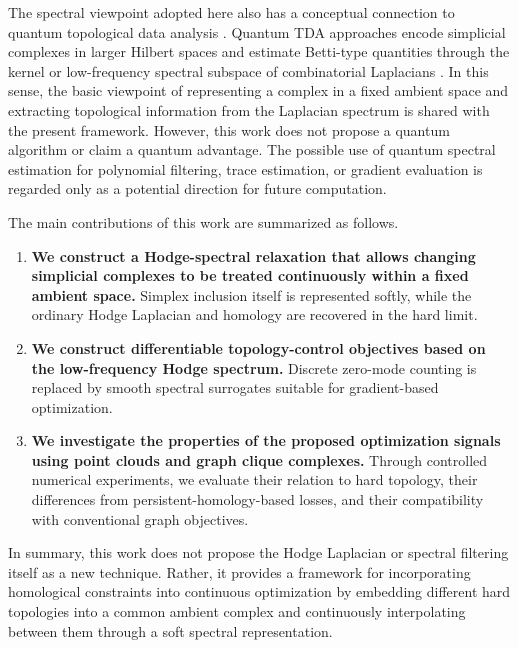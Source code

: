 \documentclass[pdflatex,sn-mathphys-num]{sn-jnl}%
\theoremstyle{thmstyleone}%
\theoremstyle{thmstyletwo}%
\theoremstyle{thmstylethree}%
\begin{document}
The spectral viewpoint adopted here also has a conceptual connection to quantum topological data analysis \cite{lloyd2016quantum,gyurik2022towards,ameneyro2024quantum,hayakawa2022quantum,yamauchi2025quantum}. Quantum TDA approaches encode simplicial complexes in larger Hilbert spaces and estimate Betti-type quantities through the kernel or low-frequency spectral subspace of combinatorial Laplacians \cite{ubaru2021quantumtopologicaldataanalysis,akhalwaya2024comparing}. In this sense, the basic viewpoint of representing a complex in a fixed ambient space and extracting topological information from the Laplacian spectrum is shared with the present framework. However, this work does not propose a quantum algorithm or claim a quantum advantage. The possible use of quantum spectral estimation for polynomial filtering, trace estimation, or gradient evaluation is regarded only as a potential direction for future computation.

The main contributions of this work are summarized as follows.

\begin{enumerate}
    \item \textbf{We construct a Hodge-spectral relaxation that allows changing simplicial complexes to be treated continuously within a fixed ambient space.}
    Simplex inclusion itself is represented softly, while the ordinary Hodge Laplacian and homology are recovered in the hard limit.

    \item \textbf{We construct differentiable topology-control objectives based on the low-frequency Hodge spectrum.}
    Discrete zero-mode counting is replaced by smooth spectral surrogates suitable for gradient-based optimization.

    \item \textbf{We investigate the properties of the proposed optimization signals using point clouds and graph clique complexes.}
    Through controlled numerical experiments, we evaluate their relation to hard topology, their differences from persistent-homology-based losses, and their compatibility with conventional graph objectives.
\end{enumerate}

In summary, this work does not propose the Hodge Laplacian or spectral filtering itself as a new technique. Rather, it provides a framework for incorporating homological constraints into continuous optimization by embedding different hard topologies into a common ambient complex and continuously interpolating between them through a soft spectral representation.
\end{document}
